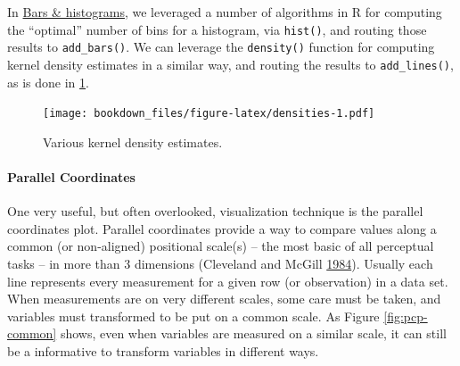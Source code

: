 \documentclass[12pt,]{isuthesis}
\newenvironment{Shaded}{\begin{snugshade}}{\end{snugshade}}
\newcommand{\KeywordTok}[1]{\textcolor[rgb]{0.13,0.29,0.53}{\textbf{{#1}}}}
\newcommand{\DataTypeTok}[1]{\textcolor[rgb]{0.13,0.29,0.53}{{#1}}}
\newcommand{\StringTok}[1]{\textcolor[rgb]{0.31,0.60,0.02}{{#1}}}
\newcommand{\OtherTok}[1]{\textcolor[rgb]{0.56,0.35,0.01}{{#1}}}
\newcommand{\NormalTok}[1]{{#1}}
\let\oldparagraph\paragraph
\renewcommand{\paragraph}[1]{\oldparagraph{#1}\mbox{}}
\begin{document}
In \protect\hyperlink{bars-histograms}{Bars \& histograms}, we leveraged
a number of algorithms in R for computing the ``optimal'' number of bins
for a histogram, via \texttt{hist()}, and routing those results to
\texttt{add\_bars()}. We can leverage the \texttt{density()} function
for computing kernel density estimates in a similar way, and routing the
results to \texttt{add\_lines()}, as is done in \ref{fig:densities}.

\begin{Shaded}
\end{Shaded}

\begin{figure}[htbp]
\centering
\texttt{[image: bookdown\_files/figure-latex/densities-1.pdf]}
\caption{\label{fig:densities}Various kernel density estimates.}
\end{figure}

\paragraph{Parallel Coordinates}\label{parallel-coordinates}

One very useful, but often overlooked, visualization technique is the
parallel coordinates plot. Parallel coordinates provide a way to compare
values along a common (or non-aligned) positional scale(s) -- the most
basic of all perceptual tasks -- in more than 3 dimensions (Cleveland
and McGill \protect\hyperlink{ref-graphical-perception}{1984}). Usually
each line represents every measurement for a given row (or observation)
in a data set. When measurements are on very different scales, some care
must be taken, and variables must transformed to be put on a common
scale. As Figure \ref{fig:pcp-common} shows, even when variables are
measured on a similar scale, it can still be a informative to transform
variables in different ways.
\end{document}
